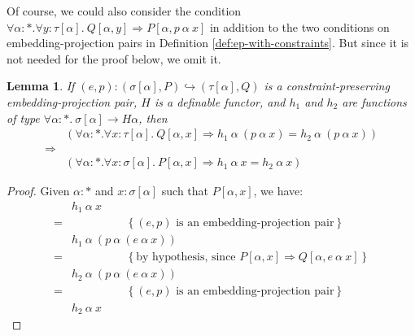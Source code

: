 \documentclass{article}[12 pt]
\newcommand{\eqAnnotation}[1]{\hspace{2cm}\left\{\textrm{#1}\right\}}
\newtheorem{lemma}{Lemma}
\theoremstyle{problemstyle}
\begin{document}
\noindent
Of course, we could also consider the condition $\forall \alpha :
*. \forall y : \tau[\alpha].~Q[\alpha,y] \Rightarrow
P[\alpha,p~\alpha~x]$ in addition to the two conditions on
embedding-projection pairs in Definition
\ref{def:ep-with-constraints}. But since it is not needed for the
proof below, we omit it.

\begin{lemma}\label{lem:e-p-reduction-constraints}
  If $(e,p) : (\sigma[\alpha], P) \hookrightarrow (\tau[\alpha], Q)$
  is a constraint-preserving embedding-projection pair, $H$ is a
  definable functor, and $h_1$ and $h_2$ are functions of type
  $\forall \alpha : *.~\sigma[\alpha] \to H \alpha$, then
  \begin{displaymath}
    \begin{array}{cl}
      & (\forall \alpha : *. \forall x : \tau[\alpha].~Q[\alpha,x]
      \Rightarrow h_1~\alpha~(p~\alpha~x) = h_2~\alpha~(p~\alpha~x))
      \\ \Rightarrow& \\ & (\forall \alpha : *. \forall x :
      \sigma[\alpha].~P[\alpha,x] \Rightarrow h_1~\alpha~x =
      h_2~\alpha~x)
    \end{array}
  \end{displaymath}
\end{lemma}

\begin{proof}
  Given $\alpha : *$ and $x : \sigma[\alpha]$ such that $P[\alpha,x]$,
  we have:
  \begin{displaymath}
    \begin{array}{cl}
      & h_1~\alpha~x \\ =&\eqAnnotation{$(e,p)$ is an
        embedding-projection pair} \\ 
      & h_1~\alpha~(p~\alpha~(e~\alpha~x)) \\ 
    = &\eqAnnotation{by hypothesis, since
      $P[\alpha,x] \Rightarrow Q[\alpha,e~\alpha~x]$} \\ & 
      h_2~\alpha~(p~\alpha~(e~\alpha~x)) \\
    = &\eqAnnotation{$(e,p)$ is an embedding-projection pair} \\ 
      & h_2~\alpha~x 
    \end{array}
  \end{displaymath}
\end{proof}
\end{document}
